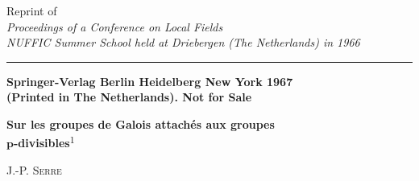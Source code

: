 \begin{center}
Reprint of\\
\textit{Proceedings of a Conference on Local Fields}\\
\textit{NUFFIC Summer School held at Driebergen (The Netherlands) in 1966}

\rule{0.87\linewidth}{0.5pt}

\textbf{Springer-Verlag Berlin Heidelberg New York 1967}\\
\textbf{(Printed in The Netherlands). Not for Sale}

\bigskip
\textbf{Sur les groupes de Galois attachés aux groupes}\\
\textbf{$\boldsymbol{p}$-divisibles}\textsuperscript{1}

\bigskip
J.-P. \textsc{Serre}
\end{center}
